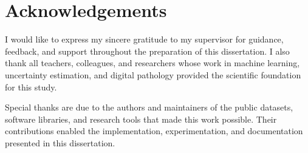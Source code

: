 \chapter*{Acknowledgements}

I would like to express my sincere gratitude to my supervisor for guidance, feedback, and support throughout the preparation of this dissertation. I also thank all teachers, colleagues, and researchers whose work in machine learning, uncertainty estimation, and digital pathology provided the scientific foundation for this study.

Special thanks are due to the authors and maintainers of the public datasets, software libraries, and research tools that made this work possible. Their contributions enabled the implementation, experimentation, and documentation presented in this dissertation.
